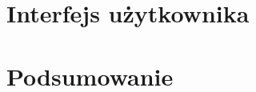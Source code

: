 \documentclass[12pt]{article} %
\numberwithin{equation}{subsection}
\numberwithin{figure}{section}
\numberwithin{table}{section}
\begin{document}
	\newpage
	
	
\section{Interfejs użytkownika}
	\hspace{0.5cm}
	
	\newpage
	
\section{Podsumowanie}
	
	\hspace{0.5cm} 
	
	\newpage	
	
\end{document}
